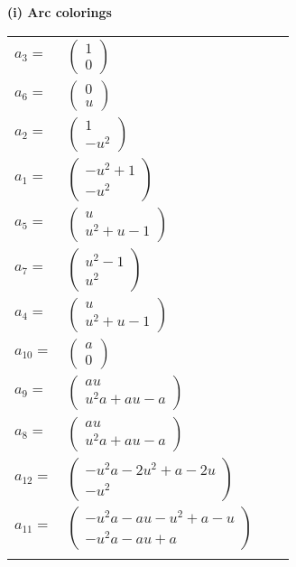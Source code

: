 \documentclass[1p]{elsarticle_modified}
\theoremstyle{definition}
\begin{document}
\flushleft \textbf{(i) Arc colorings}\\
\begin{tabular}{m{7pt} m{180pt} m{7pt} m{180pt} }
\flushright $a_{3}=$&$\begin{pmatrix}1\\0\end{pmatrix}$ \\
\flushright $a_{6}=$&$\begin{pmatrix}0\\u\end{pmatrix}$ \\
\flushright $a_{2}=$&$\begin{pmatrix}1\\- u^2\end{pmatrix}$ \\
\flushright $a_{1}=$&$\begin{pmatrix}- u^2+1\\- u^2\end{pmatrix}$ \\
\flushright $a_{5}=$&$\begin{pmatrix}u\\u^2+u-1\end{pmatrix}$ \\
\flushright $a_{7}=$&$\begin{pmatrix}u^2-1\\u^2\end{pmatrix}$ \\
\flushright $a_{4}=$&$\begin{pmatrix}u\\u^2+u-1\end{pmatrix}$ \\
\flushright $a_{10}=$&$\begin{pmatrix}a\\0\end{pmatrix}$ \\
\flushright $a_{9}=$&$\begin{pmatrix}a u\\u^2 a+a u- a\end{pmatrix}$ \\
\flushright $a_{8}=$&$\begin{pmatrix}a u\\u^2 a+a u- a\end{pmatrix}$ \\
\flushright $a_{12}=$&$\begin{pmatrix}- u^2 a-2 u^2+a-2 u\\- u^2\end{pmatrix}$ \\
\flushright $a_{11}=$&$\begin{pmatrix}- u^2 a- a u- u^2+a- u\\- u^2 a- a u+a\end{pmatrix}$\\&\end{tabular}
\end{document}
